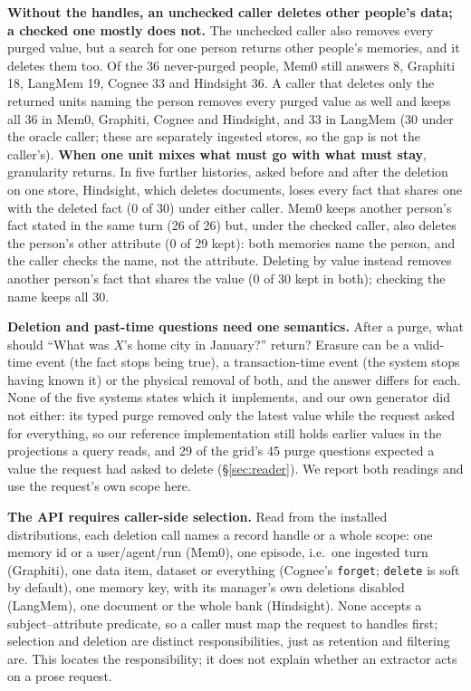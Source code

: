 \documentclass[conference]{IEEEtran}
\begin{document}
\textbf{Without the handles, an unchecked caller deletes other people's data;
a checked one mostly does not.} The unchecked caller also removes every purged value,
but a search for one person returns other people's memories, and it deletes them
too. Of the 36 never-purged people, Mem0 still answers 8, Graphiti 18, LangMem
19, Cognee 33 and Hindsight 36. A caller that deletes only the returned units
naming the person removes every purged value as well and keeps all 36 in Mem0,
Graphiti, Cognee and Hindsight, and 33 in LangMem (30 under the oracle caller;
these are separately ingested stores, so the gap is not the caller's).
\textbf{When one unit mixes what must go with what must stay}, granularity
returns. In five further histories, asked before and after the deletion on one
store, Hindsight, which deletes documents, loses every fact that shares one with
the deleted fact (0 of 30) under either caller. Mem0 keeps another person's
fact stated in the same turn (26 of 26) but, under the checked caller, also
deletes the person's other attribute (0 of 29 kept): both memories name the person, and the
caller checks the name, not the attribute. Deleting by value instead removes
another person's fact that shares the value (0 of 30 kept in both); checking
the name keeps all 30.

\textbf{Deletion and past-time questions need one semantics.} After a purge,
what should ``What was $X$'s home city in January?'' return? Erasure can be a
valid-time event (the fact stops being true), a transaction-time event (the
system stops having known it) or the physical removal of both, and the answer
differs for each. None of the five systems states which it implements, and our
own generator did not either: its typed purge removed only the latest value
while the request asked for everything, so our reference implementation still
holds earlier values in the projections a query reads, and 29 of the grid's 45
purge questions expected a value the request had asked to delete
(\S\ref{sec:reader}). We report both readings and use the request's own scope
here.

\textbf{The API requires caller-side selection.} Read from the installed
distributions, each deletion call names a record handle or a whole scope: one
memory id or a user/agent/run (Mem0), one episode, i.e.\ one ingested turn
(Graphiti), one data item, dataset or everything (Cognee's \texttt{forget};
\texttt{delete} is soft by default), one memory key, with its manager's own
deletions disabled (LangMem), one document or the whole bank (Hindsight). None
accepts a subject--attribute predicate, so a caller must map the request to
handles first; selection and deletion are distinct responsibilities, just as
retention and filtering are. This locates the responsibility; it does not
explain whether an extractor acts on a prose request.
\end{document}
